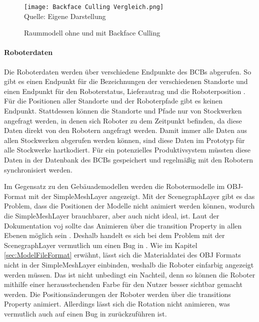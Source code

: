 \begin{figure}[H]
    \caption{Raummodell ohne und mit Backface Culling}\label{fig:BackfaceCulling}
    \texttt{[image: Backface Culling Vergleich.png]}
    \\
    Quelle: Eigene Darstellung
\end{figure}

\paragraph{Roboterdaten}\label{sec:RobotData}
Die Roboterdaten werden über verschiedene Endpunkte des \ac{BCB}s abgerufen. So gibt es einen Endpunkt für die Bezeichnungen der verschiedenen Standorte und einen Endpunkt für den Roboterstatus, Lieferautrag und die Roboterposition \cite{BCBSwagger}. Für die Positionen aller Standorte und der Roboterpfade gibt es keinen Endpunkt. Stattdessen können die Standorte und Pfade nur von Stockwerken angefragt werden, in denen sich Roboter zu dem Zeitpunkt befinden, da diese Daten direkt von den Robotern angefragt werden. Damit immer alle Daten aus allen Stockwerken abgerufen werden können, sind diese Daten im Prototyp für alle Stockwerke hartkodiert. Für ein potenzielles Produktivsystem müssten diese Daten in der Datenbank des \ac{BCB}s gespeichert und regelmäßig mit den Robotern synchronisiert werden.

Im Gegensatz zu den Gebäuademodellen werden die Robotermodelle im \ac{OBJ}-Format mit der SimpleMeshLayer \cite{DeckglSimpleMeshLayer} angezeigt. Mit der ScenegraphLayer gibt es das Problem, dass die Positionen der Modelle nicht animiert werden können, wodurch die SimpleMeshLayer brauchbarer, aber auch nicht ideal, ist. Laut der Dokumentation voj \deckgl{} sollte das Animieren über die transition Property in allen Ebenen möglich sein \cite{DeckglLayerClass}. Deshalb handelt es sich bei dem Problem mit der ScenegraphLayer vermutlich um einen Bug in \deckgl{}. Wie im Kapitel \ref{sec:ModelFileFormat} erwähnt, lässt sich die Materialdatei des \ac{OBJ} Formats nicht in der SimpleMeshLayer einbinden, weshalb die Roboter einfarbig angezeigt werden müssen. Das ist nicht unbedingt ein Nachteil, denn so können die Roboter mithilfe einer herausstechenden Farbe für den Nutzer besser sichtbar gemacht werden. Die Positionsänderungen der Roboter werden über die transitions Property animiert. Allerdings lässt sich die Rotation nicht animieren, was vermutlich auch auf einen Bug in \deckgl{} zurückzuführen ist.


